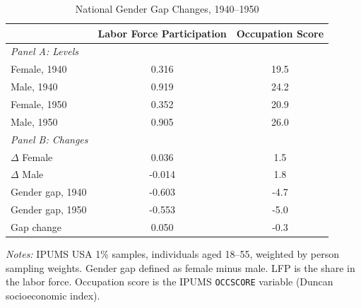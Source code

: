 \begin{table}[htbp]
\centering
\caption{National Gender Gap Changes, 1940--1950}
\label{tab:decomp}
\small
\begin{tabular}{lcc}
\hline\hline
 & Labor Force Participation & Occupation Score \\
\hline
\textit{Panel A: Levels} \\[3pt]
Female, 1940 & 0.316 & 19.5 \\
Male, 1940 & 0.919 & 24.2 \\
Female, 1950 & 0.352 & 20.9 \\
Male, 1950 & 0.905 & 26.0 \\[3pt]
\textit{Panel B: Changes} \\[3pt]
$\Delta$ Female & 0.036 & 1.5 \\
$\Delta$ Male & -0.014 & 1.8 \\
Gender gap, 1940 & -0.603 & -4.7 \\
Gender gap, 1950 & -0.553 & -5.0 \\
Gap change & 0.050 & -0.3 \\
\hline\hline
\end{tabular}
\begin{tablenotes}
\small
\item \textit{Notes:} IPUMS USA 1\% samples, individuals aged 18--55, weighted by person sampling weights. Gender gap defined as female minus male. LFP is the share in the labor force. Occupation score is the IPUMS \texttt{OCCSCORE} variable (Duncan socioeconomic index).
\end{tablenotes}
\end{table}
